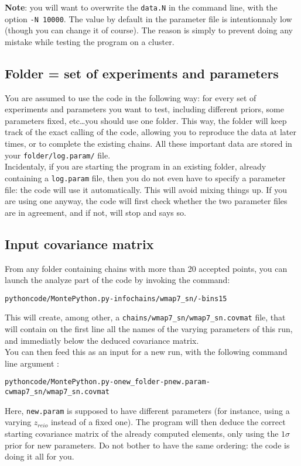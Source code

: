 \documentclass[10pt]{article}
\begin{document}
  {\bf Note}: you will want to overwrite the \verb?data.N? in the command line,
  with the option \verb?-N 10000?. The value by default in the parameter file
  is intentionnaly low (though you can change it of course). The reason is
  simply to prevent doing any mistake while testing the program on a cluster.

  \subsection{Folder = set of experiments and parameters}
  
  You are assumed to use the code in the following way: for every set of
  experiments and parameters you want to test, including different priors, some
  parameters fixed, etc\ldots you should use one folder. This way, the folder
  will keep track of the exact calling of the code, allowing you to reproduce
  the data at later times, or to complete the existing chains. All these
  important data are stored in your \verb?folder/log.param/? file.\\

  Incidentaly, if you are starting the program in an existing folder, already
  containing a \verb?log.param? file, then you do not even have to specify a
  parameter file: the code will use it automatically. This will avoid mixing
  things up. If you are using one anyway, the code will first check whether the
  two parameter files are in agreement, and if not, will stop and says so.\\

  \subsection{Input covariance matrix}

  From any folder containing chains with more than 20 accepted points, you can
  launch the analyze part of the code by invoking the command:
  \begin{alltt}
    python code/MontePython.py -info chains/wmap7_sn/ -bins 15
  \end{alltt}
  This will create, among other, a \verb?chains/wmap7_sn/wmap7_sn.covmat? file,
  that will contain on the first line all the names of the varying parameters
  of this run, and immediatly below the deduced covariance matrix.\\

  You can then feed this as an input for a new run, with the following command
  line argument :
  \begin{alltt}
    python code/MontePython.py -o new_folder -p new.param -c wmap7_sn/wmap7_sn.covmat
  \end{alltt}
  Here, \verb?new.param? is supposed to have different parameters (for
  instance, using a varying $z_{reio}$ instead of a fixed one). The program
  will then deduce the correct starting covariance matrix of the already
  computed elements, only using the $1\sigma$ prior for new parameters. Do not
  bother to have the same ordering: the code is doing it all for you.
\end{document}
